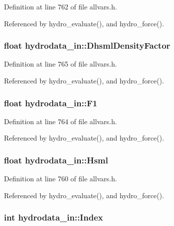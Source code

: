 Definition at line 762 of file allvars.h.



Referenced by hydro\_\-evaluate(), and hydro\_\-force().

\hypertarget{structhydrodata__in_ad2da50b0d4b51a53f9fb5cb4c41f20b8}{
\subsubsection[{DhsmlDensityFactor}]{\setlength{\rightskip}{0pt plus 5cm}float {\bf hydrodata\_\-in::DhsmlDensityFactor}}}
\label{structhydrodata__in_ad2da50b0d4b51a53f9fb5cb4c41f20b8}


Definition at line 765 of file allvars.h.



Referenced by hydro\_\-evaluate(), and hydro\_\-force().

\hypertarget{structhydrodata__in_a2b0cc9653b307eac998cec7175036b20}{
\subsubsection[{F1}]{\setlength{\rightskip}{0pt plus 5cm}float {\bf hydrodata\_\-in::F1}}}
\label{structhydrodata__in_a2b0cc9653b307eac998cec7175036b20}


Definition at line 764 of file allvars.h.



Referenced by hydro\_\-evaluate(), and hydro\_\-force().

\hypertarget{structhydrodata__in_ae24f9ceb40451913af1ab6e793772bdd}{
\subsubsection[{Hsml}]{\setlength{\rightskip}{0pt plus 5cm}float {\bf hydrodata\_\-in::Hsml}}}
\label{structhydrodata__in_ae24f9ceb40451913af1ab6e793772bdd}


Definition at line 760 of file allvars.h.



Referenced by hydro\_\-evaluate(), and hydro\_\-force().

\hypertarget{structhydrodata__in_a630be87b2fd46a0e22f57bde1a48e015}{
\subsubsection[{Index}]{\setlength{\rightskip}{0pt plus 5cm}int {\bf hydrodata\_\-in::Index}}}
\label{structhydrodata__in_a630be87b2fd46a0e22f57bde1a48e015}


